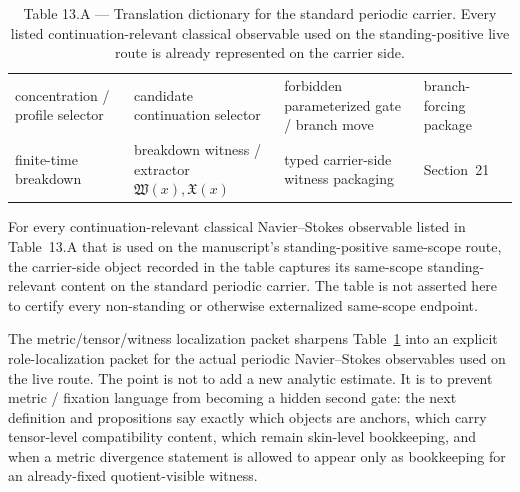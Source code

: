 \begin{table}[t]
\begin{tabular}{>{\raggedright\arraybackslash}p{} >{\raggedright\arraybackslash}p{} >{\raggedright\arraybackslash}p{} >{\raggedright\arraybackslash}p{}}
\addlinespace
concentration / profile selector & candidate continuation selector & forbidden parameterized gate / branch move & branch-forcing package \\
\addlinespace
finite-time breakdown & breakdown witness / extractor $\mathfrak W(x),\mathfrak X(x)$ & typed carrier-side witness packaging & Section~21 \\
\bottomrule
\end{tabular}
\caption{Table 13.A --- Translation dictionary for the standard periodic carrier. Every listed continuation-relevant classical observable used on the standing-positive live route is already represented on the carrier side.}
\label{tab:translation-dictionary-standard-carrier}
\end{table}

\label{cor:row-by-row-continuation-completeness}
\begin{tcolorbox}[title={Corollary 13.23A (Row-by-row verification of strong continuation-completeness)}, colback=blue!2!white, colframe=blue!55!black]
For every continuation-relevant classical Navier--Stokes observable listed in Table~13.A that is used on the manuscript's standing-positive same-scope route, the carrier-side object recorded in the table captures its same-scope standing-relevant content on the standard periodic carrier. The table is not asserted here to certify every non-standing or otherwise externalized same-scope endpoint.


\end{tcolorbox}

The metric/tensor/witness localization packet sharpens Table~\ref{tab:translation-dictionary-standard-carrier} into an explicit role-localization packet for the actual periodic Navier--Stokes observables used on the live route. The point is not to add a new analytic estimate. It is to prevent metric / fixation language from becoming a hidden second gate: the next definition and propositions say exactly which objects are anchors, which carry tensor-level compatibility content, which remain skin-level bookkeeping, and when a metric divergence statement is allowed to appear only as bookkeeping for an already-fixed quotient-visible witness.

